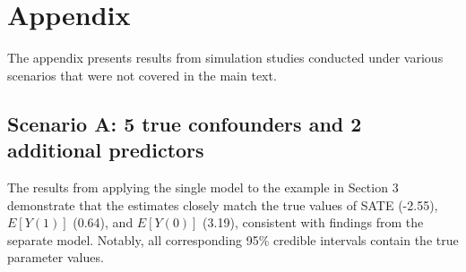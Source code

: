 

\address{Yeonghoon Yoo\\
  Department of Statistics, SungKyunKwan University\\
  25-2 SungKyunKwan University, Jongno-gu\\
  Seoul 03063, South Korea\\
  }

\address{Chanmin Kim (corresponding author)\\
  Department of Statistics, SungKyunKwan University\\
  25-2 SungKyunKwan University, Jongno-gu\\
  Seoul 03063, South Korea\\
  (ORCiD: 0000-0002-2588-6704)\\
  }

\newpage

\section*{Appendix}

The appendix presents results from simulation studies conducted under various scenarios that were not covered in the main text.

\subsection*{Scenario A: 5 true confounders and 2 additional predictors}
The results from applying the single model to the example in Section 3 demonstrate that the estimates closely match the true values of SATE (-2.55), \(E[Y(1)]\) (0.64), and \(E[Y(0)]\) (3.19), consistent with findings from the separate model. Notably, all corresponding 95\% credible intervals contain the true parameter values.
\renewcommand{\thefigure}{A\arabic{figure}}
\setcounter{figure}{0}

